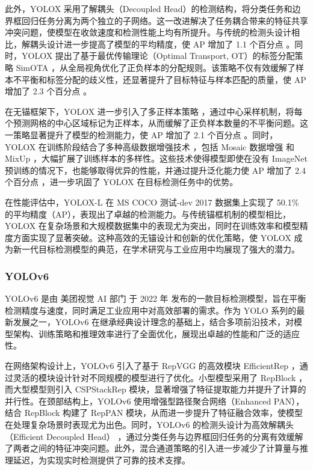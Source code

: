 \documentclass[11pt,twocolumn]{ctexart}
\begin{document}
此外，YOLOX 采用了解耦头（Decoupled Head）的检测结构，将分类任务和边界框回归任务分离为两个独立的子网络。这一改进解决了任务耦合带来的特征共享冲突问题，使模型在收敛速度和检测性能上均有所提升。与传统的检测头设计相比，解耦头设计进一步提高了模型的平均精度，使 AP 增加了 1.1 个百分点 。同时，YOLOX 提出了基于最优传输理论（Optimal Transport, OT）的标签分配策略 SimOTA ，从全局视角优化了正负样本的分配规则。该策略不仅有效缓解了样本不平衡和标签分配的歧义性，还显著提升了目标特征与样本匹配的质量，使 AP 增加了 2.3 个百分点 。

在无锚框架下，YOLOX 进一步引入了多正样本策略 ，通过中心采样机制，将每个预测网格的中心区域标记为正样本，从而缓解了正负样本数量的不平衡问题。这一策略显著提升了模型的检测能力，使 AP 增加了 2.1 个百分点 。同时，YOLOX 在训练阶段结合了多种高级数据增强技术 ，包括 Mosaic 数据增强 和 MixUp ，大幅扩展了训练样本的多样性。这些技术使得模型即使在没有 ImageNet 预训练的情况下，也能够取得优异的性能，并通过提升泛化能力使 AP 增加了 2.4 个百分点 ，进一步巩固了 YOLOX 在目标检测任务中的优势。

在性能评估中，YOLOX-L 在 MS COCO 测试-dev 2017 数据集上实现了 50.1\% 的平均精度（AP），表现出了卓越的检测能力。与传统锚框机制的模型相比，YOLOX 在复杂场景和大规模数据集中的表现尤为突出，同时在训练效率和模型精度方面实现了显著突破。这种高效的无锚设计和创新的优化策略，使 YOLOX 成为新一代目标检测模型的典范，在学术研究与工业应用中均展现了强大的潜力。
\subsubsection{YOLOv6}
YOLOv6\cite{li2022yolov6} 是由 美团视觉 AI 部门 于 2022 年 发布的一款目标检测模型，旨在平衡检测精度与速度，同时满足工业应用中对高效部署的需求。作为 YOLO 系列的最新发展之一，YOLOv6 在继承经典设计理念的基础上，结合多项前沿技术，对模型架构、训练策略和推理效率进行了全面优化，展现出卓越的性能和广泛的适应性。

在网络架构设计上，YOLOv6 引入了基于 RepVGG\cite{ding2021repvgg} 的高效模块 EfficientRep ，通过灵活的模块设计针对不同规模的模型进行了优化。小型模型采用了 RepBlock ，而大型模型则引入 CSPStackRep 模块，显著增强了特征提取能力并提升了计算的并行性。在颈部结构上，YOLOv6 使用增强型路径聚合网络（Enhanced PAN），结合 RepBlock 构建了 RepPAN 模块，从而进一步提升了特征融合效率，使模型在处理复杂场景时表现尤为出色。同时，YOLOv6 的检测头设计为高效解耦头（Efficient Decoupled Head） ，通过分类任务与边界框回归任务的分离有效缓解了两者之间的特征冲突问题。此外，混合通道策略的引入进一步减少了计算量与推理延迟，为实现实时检测提供了可靠的技术支撑。
\end{document}

